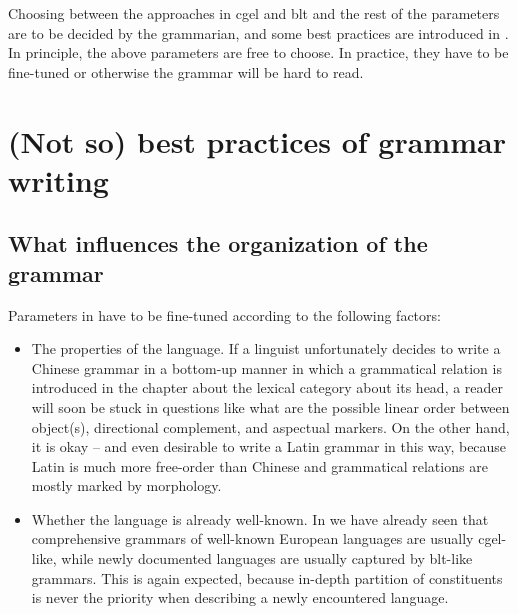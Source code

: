 \documentclass{article}
\begin{document}
Choosing between the approaches in \ac{cgel} and \ac{blt} 
and the rest of the parameters are to be decided by the grammarian,
and some best practices are introduced in .
In principle, the above parameters are free to choose.
In practice, they have to be fine-tuned or otherwise the grammar will be hard to read.

\section{(Not so) best practices of grammar writing}\label{sec:best-practice}

\subsection{What influences the organization of the grammar}

Parameters in  have to be fine-tuned according to the following factors:
\begin{itemize}
    \item The properties of the language. 
    If a linguist unfortunately decides to write a Chinese grammar 
    in a bottom-up manner
    in which a grammatical relation is introduced in the chapter about the lexical category about its head,
    a reader will soon be stuck in questions like 
    what are the possible linear order between object(s), directional complement, and aspectual markers.
    On the other hand, it is okay -- and even desirable to write a Latin grammar in this way,
    because Latin is much more free-order than Chinese 
    and grammatical relations are mostly marked by morphology.
    \item Whether the language is already well-known. 
    In  we have already seen that
    comprehensive grammars of well-known European languages are usually \ac{cgel}-like,
    while newly documented languages are usually captured by \ac{blt}-like grammars.
    This is again expected, because in-depth partition of constituents 
    is never the priority when describing a newly encountered language.
\end{itemize}

\end{document}
